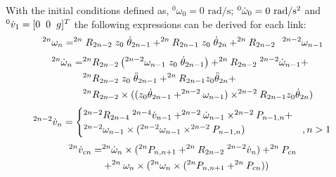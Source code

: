\documentclass[a4paper,12pt]{report}
\begin{document}
With the initial conditions defined as, $^0\omega_{0}=0\text{ rad/s}$; $^0\dot{\omega}_{0}=0 \text{ rad/s\textsuperscript{2}}$ and $^{0}\dot{v}_{1}=[0\hspace{2mm}0\hspace{2mm}g]^T$ the following expressions can be derived for each link:
\begin{equation}
^{2n}\omega_{n} = ^{2n}R_{2n-2} \hspace{1mm}z_0\hspace{1mm} \dot{\theta}_{2n-1} + ^{2n}R_{2n-1} \hspace{1mm}z_0\hspace{1mm} \dot{\theta}_{2n} + ^{2n}R_{2n-2}\hspace{2.5mm}^{2n-2}\omega_{n-1}
\end{equation}
\vspace{3mm}
\begin{equation}
\begin{split}
^{2n}\dot{\omega}_{n} =& ^{2n}R_{2n-2}\left(^{2n-2}\omega_{n-1}\hspace{1mm} z_0 \hspace{1mm} \dot{\theta}_{2n-1}\right) + ^{2n}R_{2n-2} \hspace{1mm} ^{2n-2}\dot{\omega}_{n-1} + \\ &^{2n}R_{2n-2}\hspace{1mm} z_0 \hspace{1mm} \ddot{\theta}_{2n-1} + ^{2n}R_{2n-1} z_0 \ddot{\theta}_{2n} +\\ 
& ^{2n}R_{2n-2} \times ((z_0 \dot{\theta}_{2n-1}+ ^{2n-2}\omega_{n-1}) \times ^{2n-2}R_{2n-1} z_0 \dot{\theta}_{2n}) 
\end{split}
\end{equation}
\vspace{3mm}
\begin{equation}
^{2n-2}\dot{v}_{n} =
\begin{cases}
^{2n-2}R_{2n-4} \hspace{1mm} ^{2n-4}\dot{v}_{n-1} + ^{2n-2}\dot{\omega}_{n-1} \times ^{2n-2}P_{n-1,n} + \\
^{2n-2}\omega_{n-1} \times (^{2n-2}\omega_{n-1} \times ^{2n-2}P_{n-1,n}) & , n>1\\
\end{cases}
\end{equation}
\vspace{3mm}
\begin{equation}
\begin{split}
^{2n}\dot{v}_{cn} = & ^{2n}\dot{\omega}_{n} \times (^{2n}P_{n,n+1} + ^{2n}R_{2n-2} \hspace{1mm} ^{2n-2}\dot{v}_{n}) + ^{2n}P_{cn} \\
& + ^{2n}\omega_{n} \times (^{2n}\omega_{n} \times (^{2n}P_{n,n+1} + ^{2n}P_{cn})) 
\end{split}
\end{equation}
\end{document}
